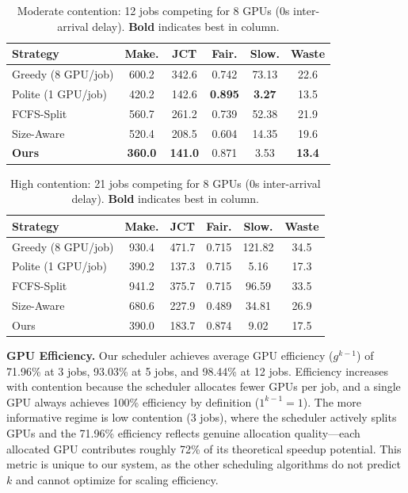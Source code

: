 \documentclass[letterpaper,10pt]{article}
\begin{document}
\begin{table}[ht]
\centering
\caption{Moderate contention: 12 jobs competing for 8 GPUs (0s inter-arrival delay). \textbf{Bold} indicates best in column.}
\label{tab:results_12jobs}
\footnotesize
\setlength{\tabcolsep}{3pt}
\begin{tabular}{lccccc}
\toprule
Strategy & Make. & JCT & Fair. & Slow. & Waste \\
\midrule
Greedy (8 GPU/job) & 600.2 & 342.6 & 0.742 & 73.13 & 22.6 \\
Polite (1 GPU/job) & 420.2 & 142.6 & \textbf{0.895} & \textbf{3.27} & 13.5 \\
FCFS-Split & 560.7 & 261.2 & 0.739 & 52.38 & 21.9 \\
Size-Aware & 520.4 & 208.5 & 0.604 & 14.35 & 19.6 \\
\textbf{Ours} & \textbf{360.0} & \textbf{141.0} & 0.871 & 3.53 & \textbf{13.4} \\
\bottomrule
\end{tabular}
\end{table}

\begin{table}[ht]
\centering
\caption{High contention: 21 jobs competing for 8 GPUs (0s inter-arrival delay). \textbf{Bold} indicates best in column.}
\label{tab:results_22jobs}
\footnotesize
\setlength{\tabcolsep}{3pt}
\begin{tabular}{lccccc}
\toprule
Strategy & Make. & JCT & Fair. & Slow. & Waste \\
\midrule
Greedy (8 GPU/job) & 930.4 & 471.7 & 0.715 & 121.82 & 34.5 \\
Polite (1 GPU/job) & 390.2 & 137.3 & 0.715 & 5.16 & 17.3 \\
FCFS-Split & 941.2 & 375.7 & 0.715 & 96.59 & 33.5 \\
Size-Aware & 680.6 & 227.9 & 0.489 & 34.81 & 26.9 \\
Ours & 390.0 & 183.7 & 0.874 & 9.02 & 17.5 \\
\bottomrule
\end{tabular}
\end{table}

\textbf{GPU Efficiency.} Our scheduler achieves average GPU efficiency ($g^{k-1}$) of 71.96\% at 3 jobs, 93.03\% at 5 jobs, and 98.44\% at 12 jobs. Efficiency increases with contention because the scheduler allocates fewer GPUs per job, and a single GPU always achieves 100\% efficiency by definition ($1^{k-1} = 1$). The more informative regime is low contention (3 jobs), where the scheduler actively splits GPUs and the 71.96\% efficiency reflects genuine allocation quality---each allocated GPU contributes roughly 72\% of its theoretical speedup potential. This metric is unique to our system, as the other scheduling algorithms do not predict $k$ and cannot optimize for scaling efficiency.
\end{document}
